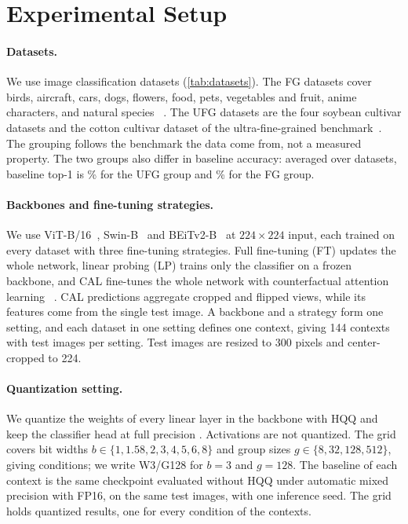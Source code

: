 \section{Experimental Setup}
\label{sec:setup}

\paragraph{Datasets.}
We use  image classification datasets (\cref{tab:datasets}).
The  FG datasets cover birds, aircraft, cars, dogs, flowers, food, pets, vegetables and fruit, anime characters, and natural species~\cite{wah2011cub,vanhorn2015nabirds,maji2013fine,krause2013cars,khosla2011dogs,nilsback2008flowers,bossard2014food,parkhi2012pets,hou2017vegfru,vanhorn2018inat} .
The  UFG datasets are the four soybean cultivar datasets and the cotton cultivar dataset of the ultra-fine-grained benchmark~\cite{yu2021benchmark}.
The grouping follows the benchmark the data come from, not a measured property.
The two groups also differ in baseline accuracy: averaged over datasets, baseline top-1 is \% for the UFG group and \% for the FG group.



\paragraph{Backbones and fine-tuning strategies.}
We use ViT-B/16~\cite{dosovitskiy2021vit}, Swin-B~\cite{liu2021swin} and BEiTv2-B~\cite{peng2022beitv2} at $224\times224$ input, each trained on every dataset with three fine-tuning strategies.
Full fine-tuning (FT) updates the whole network, linear probing (LP) trains only the classifier on a frozen backbone, and CAL fine-tunes the whole network with counterfactual attention learning~\cite{rao2021cal} .
CAL predictions aggregate cropped and flipped views, while its features come from the single test image.
A backbone and a strategy form one setting, and each dataset in one setting defines one context, giving 144 contexts with  test images per setting.
Test images are resized to 300 pixels and center-cropped to 224.

\paragraph{Quantization setting.}
We quantize the weights of every linear layer in the backbone with HQQ and keep the classifier head at full precision .
Activations are not quantized.
The grid covers bit widths $b \in \{1, 1.58, 2, 3, 4, 5, 6, 8\}$ and group sizes $g \in \{8, 32, 128, 512\}$, giving  conditions; we write W3/G128 for $b=3$ and $g=128$.
The baseline of each context is the same checkpoint evaluated without HQQ under automatic mixed precision with FP16, on the same test images, with one inference seed.
The grid holds  quantized results, one for every condition of the  contexts.

